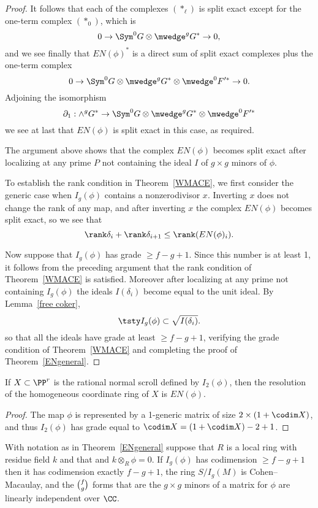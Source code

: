 \begin{proof}
It follows
that each of the complexes $(*_{\ell})$ is split exact except for the
one-term complex $(*_{0})$, which is
$$
0\to \Sym^{0}G\otimes\mwedge^{g}G^{*}\to 0,
$$
and we see finally that $EN(\phi)^{*}$ is a direct sum of split exact complexes
plus the one-term complex
$$
0\to \Sym^{0}G\otimes\mwedge^{g}G^{*}\otimes \mwedge^{0}F'^{*} \to 0.
$$
Adjoining the isomorphism
$$
\partial_{1}: \wedge^{g}G^{*} \to
\Sym^{0}G\otimes\mwedge^{g}G^{*}\otimes \mwedge^{0}F'^{*}
$$
  we see at last that $EN(\phi)$ is split exact in this case, as required.

The argument above shows that the
complex $EN(\phi)$ becomes split exact after localizing at any prime $P$ not containing
the ideal $I$ of $g\times g$ minors of $\phi$. 

To establish the rank condition in Theorem~\ref{WMACE}, we first consider the
generic case when $I_{g}(\phi)$ contains a nonzerodivisor $x$. Inverting $x$
does not change the rank of any map, and after inverting $x$ the
complex $EN(\phi)$ becomes
split exact, so we see that 
$$
\rank \delta_{i}+\rank \delta_{i+1} \leq \rank (EN(\phi)_{i}).
$$

Now suppose that $I_{g}(\phi)$ has grade $\geq f-g+1$. Since this number is
at least 1, it follows from the preceding argument that the rank condition
of Theorem~\ref{WMACE} is satisfied. Moreover after localizing at any prime
not containing $I_{g}(\phi)$ the ideals $I(\delta_{i})$ become equal to the unit ideal.
By Lemma~\ref{free coker},
 $$
\tsty %
I_{g}(\phi) \subset \sqrt{I(\delta_i)}.
$$
so that all the ideals have grade at least $\geq f-g+1$, verifying the grade condition
of Theorem~\ref{WMACE} and completing the proof of Theorem~\ref{ENgeneral}.
\end{proof}

\begin{corollary}\label{resolution of a scroll}
If $X\subset \PP^{r}$ is the rational normal scroll defined by $I_{2}(\phi)$, then the resolution of the homogeneous
coordinate ring of $X$ is $EN(\phi)$.
\end{corollary}

\begin{proof}
The map $\phi$ is represented by a 1-generic matrix of size $2\times (1+\codim X)$, and thus $I_{2}(\phi)$ has grade equal to $\codim X = (1+\codim X) - 2 +1$.
\end{proof}

\begin{corollary}\label{E-N cor}
With notation as in Theorem~\ref{ENgeneral} suppose that $R$ is a local ring
with residue field $k$ and that
and $k\otimes_{R}\phi = 0$.
If $I_{g}(\phi)$
has codimension $\geq f-g+1$ then it has
codimension exactly $f-g+1$, the ring $S/I_g(M)$ is Cohen--Macaulay,
and the $\tbinom{f}{g}$ forms
that are the $g\times g$ minors of a matrix for $\phi$ are linearly
independent over $\CC$.
\end{corollary}

